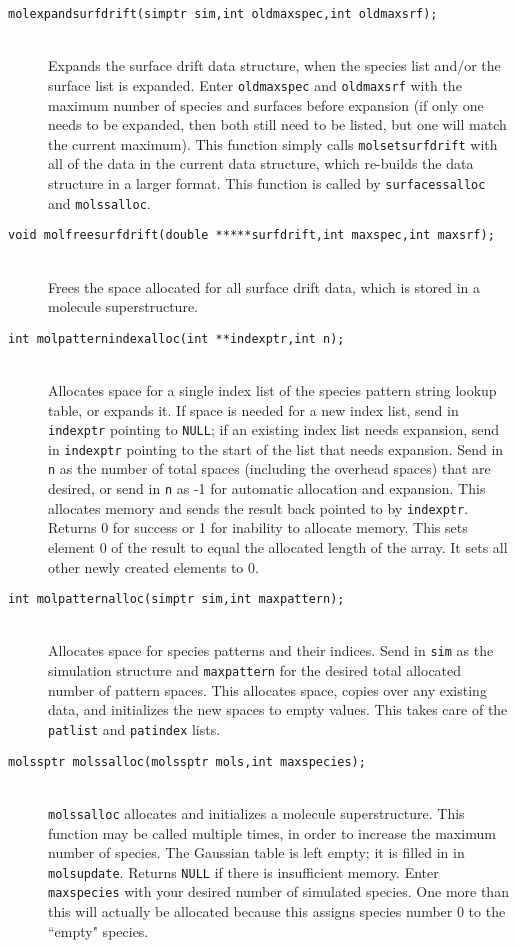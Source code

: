 \documentclass {book}
\newcommand {\ttt} {\texttt}
\begin{document}
\begin{description}
\item[\ttt{molexpandsurfdrift(simptr sim,int oldmaxspec,int oldmaxsrf);}]
\hfill \\
Expands the surface drift data structure, when the species list and/or the surface list is expanded. Enter \ttt{oldmaxspec} and \ttt{oldmaxsrf} with the maximum number of species and surfaces before expansion (if only one needs to be expanded, then both still need to be listed, but one will match the current maximum). This function simply calls \ttt{molsetsurfdrift} with all of the data in the current data structure, which re-builds the data structure in a larger format. This function is called by \ttt{surfacessalloc} and \ttt{molssalloc}.

\item[\ttt{void molfreesurfdrift(double *****surfdrift,int maxspec,int maxsrf);}]
\hfill \\
Frees the space allocated for all surface drift data, which is stored in a molecule superstructure.

\item[\ttt{int molpatternindexalloc(int **indexptr,int n);}]
\hfill \\
Allocates space for a single index list of the species pattern string lookup table, or expands it. If space is needed for a new index list, send in \ttt{indexptr} pointing to \ttt{NULL}; if an existing index list needs expansion, send in \ttt{indexptr} pointing to the start of the list that needs expansion. Send in \ttt{n} as the number of total spaces (including the overhead spaces) that are desired, or send in \ttt{n} as -1 for automatic allocation and expansion. This allocates memory and sends the result back pointed to by \ttt{indexptr}. Returns 0 for success or 1 for inability to allocate memory. This sets element 0 of the result to equal the allocated length of the array. It sets all other newly created elements to 0.

\item[\ttt{int molpatternalloc(simptr sim,int maxpattern);}]
\hfill \\
Allocates space for species patterns and their indices. Send in \ttt{sim} as the simulation structure and \ttt{maxpattern} for the desired total allocated number of pattern spaces. This allocates space, copies over any existing data, and initializes the new spaces to empty values. This takes care of the \ttt{patlist} and \ttt{patindex} lists.

\item[\ttt{molssptr molssalloc(molssptr mols,int maxspecies);}]
\hfill \\
\ttt{molssalloc} allocates and initializes a molecule superstructure. This function may be called multiple times, in order to increase the maximum number of species. The Gaussian table is left empty; it is filled in in \ttt{molsupdate}. Returns \ttt{NULL} if there is insufficient memory. Enter \ttt{maxspecies} with your desired number of simulated species. One more than this will actually be allocated because this assigns species number 0 to the ``empty" species.


\end{description}
\end{document}
